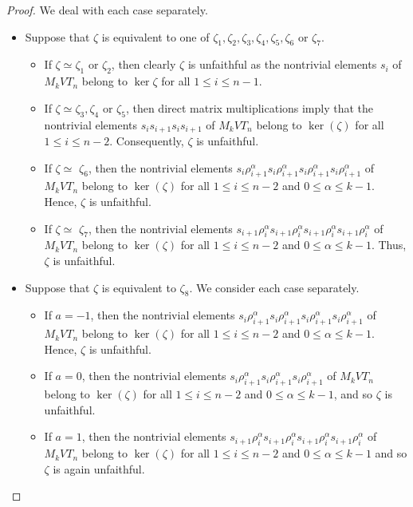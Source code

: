 \documentclass[preprint]{elsarticle}
\begin{document}
\begin{proof}
We deal with each case separately.
\begin{itemize}
\item[(a)] Suppose that $\zeta$ is equivalent to one of $\zeta_1, \zeta_2,\zeta_3,\zeta_4,\zeta_5,\zeta_6$  or $\zeta_7$. 
\begin{itemize}
    \item[(i)] If $\zeta \simeq \zeta_1$ or $\zeta_2$, then clearly $\zeta$ is unfaithful as the nontrivial elements $s_i$ of $M_kVT_n$ belong to $\ker{\zeta}$ for all $1\leq i \leq n-1$.
    \item[(ii)] If $\zeta \simeq \zeta_3,\zeta_4$ or $\zeta_5$, then direct matrix multiplications imply that the nontrivial elements \(s_i s_{i+1} s_i s_{i+1}\) of $M_kVT_n$ belong to \(\ker(\zeta)\) for all $1\leq i \leq n-2$. Consequently, \(\zeta\) is unfaithful. 
    \item[(iii)]  If \(\zeta \simeq\) $\zeta_6$, then the nontrivial elements \(s_i \rho_{i+1}^\alpha s_i \rho_{i+1}^\alpha s_i \rho_{i+1}^\alpha s_i \rho_{i+1}^\alpha\) of $M_kVT_n$ belong to \(\ker(\zeta)\) for all $1\leq i \leq n-2$ and $0\leq \alpha \leq k-1$. Hence, \(\zeta\) is unfaithful.
    \item[(iv)] If \(\zeta\simeq \) \(\zeta_7\), then the nontrivial elements \(s_{i+1} \rho_i^\alpha s_{i+1} \rho_i^\alpha s_{i+1} \rho_i^\alpha s_{i+1} \rho_i^\alpha \) of $M_kVT_n$ belong to \(\ker(\zeta)\) for all $1\leq i \leq n-2$ and $0\leq \alpha \leq k-1$. Thus, $\zeta$ is unfaithful.
\end{itemize}
\item[(b)] Suppose that \(\zeta\) is equivalent to $\zeta_8$. We consider each case separately.
\begin{itemize}
    \item[(i)] If $a=-1$, then the nontrivial elements $s_i \rho_{i+1}^\alpha s_i \rho_{i+1}^\alpha s_i \rho_{i+1}^\alpha s_i \rho_{i+1}^\alpha$ of $M_kVT_n$ belong to $\ker(\zeta)$ for all $1\leq i \leq n-2$ and $0\leq \alpha \leq k-1$. Hence, $\zeta$ is unfaithful.
    \item[(ii)] If $a=0$, then the nontrivial elements \(s_i \rho_{i+1}^\alpha s_i \rho_{i+1}^\alpha s_i \rho_{i+1}^\alpha\) of $M_kVT_n$ belong to \(\ker(\zeta)\) for all $1\leq i \leq n-2$ and $0\leq \alpha \leq k-1$, and so \(\zeta\) is unfaithful.
    \item[(iii)] If $a=1$, then the nontrivial elements $s_{i+1}\rho_i^\alpha s_{i+1}\rho_i^\alpha s_{i+1}\rho_i^\alpha s_{i+1}\rho_i^\alpha$ of $M_kVT_n$ belong to $\ker(\zeta)$ for all $1\leq i \leq n-2$ and $0\leq \alpha \leq k-1$ and so \(\zeta\) is again unfaithful.
\end{itemize}
\end{itemize}
\end{proof}
\end{document}
